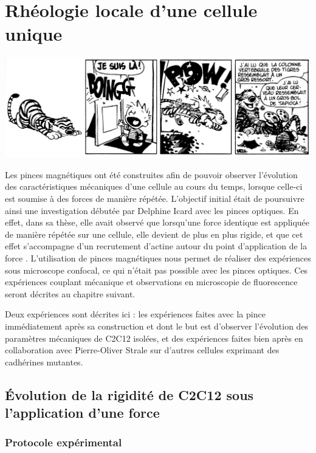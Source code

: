 \documentclass{report}
\begin{document}
\chapter{Rhéologie locale d'une cellule unique}

\begin{center}
\includegraphics[scale=0.7]{Chapitre7.png}
\end{center}

\newpage

Les pinces magnétiques ont été construites afin de pouvoir observer l'évolution des caractéristiques mécaniques d'une cellule au cours du temps, lorsque celle-ci est soumise à des forces de manière répétée. L'objectif initial était de poursuivre ainsi une investigation débutée par Delphine Icard avec les pinces optiques. En effet, dans sa thèse, elle avait observé que lorsqu'une force identique est appliquée de manière répétée sur une cellule, elle devient de plus en plus rigide, et que cet effet s'accompagne d'un recrutement d'actine autour du point d'application de la force \parencite{icard-arcizet_cell_2008}. L'utilisation de pinces magnétiques nous permet de réaliser des expériences sous microscope confocal, ce qui n'était pas possible avec les pinces optiques. Ces expériences couplant mécanique et observations en microscopie de fluorescence seront décrites au chapitre suivant. 

Deux expériences sont décrites ici : les expériences faites avec la pince immédiatement après sa construction et dont le but est d'observer l'évolution des paramètres mécaniques de C2C12 isolées, et des expériences faites bien après en collaboration avec Pierre-Oliver Strale sur d'autres cellules exprimant des cadhérines mutantes. 

\section{\'Evolution de la rigidité de C2C12 sous l'application d'une force}

\subsection{Protocole expérimental}
\end{document}
